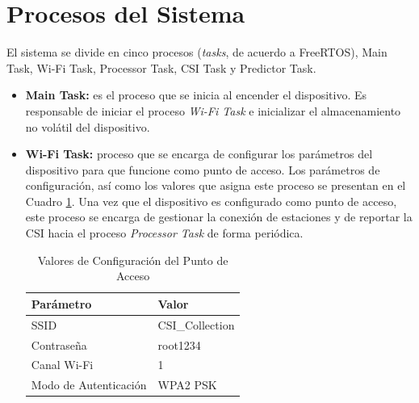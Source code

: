 \documentclass{scrreprt}
\begin{document}
\section{Procesos del Sistema }
El sistema se divide en cinco procesos (\emph{tasks}, de acuerdo a FreeRTOS), Main Task, Wi-Fi Task, Processor Task, CSI Task y Predictor Task. 
\begin{itemize}
  \item \textbf{Main Task: } es el proceso que se inicia al encender el dispositivo. Es responsable de iniciar el proceso \emph{Wi-Fi Task} e inicializar el almacenamiento no volátil del dispositivo.
  \item \textbf{Wi-Fi Task: } proceso que se encarga de configurar los parámetros del dispositivo para que funcione como punto de acceso. Los parámetros de configuración, así como los valores que asigna este proceso se presentan en el Cuadro \ref{tab:ap_conf}. Una vez que el dispositivo es configurado como punto de acceso, este proceso se encarga de gestionar la conexión de estaciones y de reportar la CSI hacia el proceso \emph{Processor Task} de forma periódica.
  
    \begin{table}[h!]
    \caption{Valores de Configuración del Punto de Acceso}
    \begin{tabularx}{\textwidth}{|X | X |}
        \hline
        \textbf{Parámetro} & \textbf{Valor} \\
        \hline 
        SSID & CSI_Collection \\
        \hline 
        Contraseña & root1234 \\
        \hline 
        Canal Wi-Fi & 1 \\
        \hline 
        Modo de Autenticación & WPA2 PSK \\
        \hline 
    \end{tabularx}
    \label{tab:ap_conf}
    \end{table}


\end{itemize}
\end{document}
